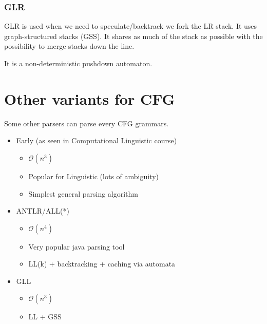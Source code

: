         \subsubsection{GLR}
            GLR is used when we need to speculate/backtrack we fork the LR
            stack. It uses graph-structured stacks (GSS). It shares as much of
            the stack as possible with the possibility to merge stacks down the
            line. 

            It is a non-deterministic pushdown automaton.
\section{Other variants for CFG}
    Some other parsers can parse every CFG grammars.
    \begin{itemize}
        \item Early (as seen in Computational Linguistic course)
        \begin{itemize}
            \item $\mathcal{O}(n^3)$
            \item Popular for Linguistic (lots of ambiguity)
            \item Simplest general parsing algorithm
        \end{itemize}
        \item ANTLR/ALL(*)
        \begin{itemize}
            \item $\mathcal{O}(n^4)$
            \item Very popular java parsing tool
            \item LL(k) + backtracking + caching via automata
        \end{itemize}
        \item GLL
        \begin{itemize}
            \item $\mathcal{O}(n^3)$
            \item LL + GSS
        \end{itemize}
    \end{itemize}
\section{}